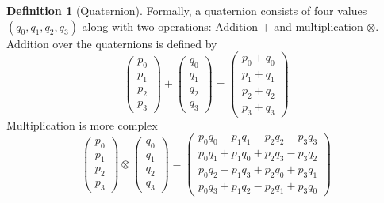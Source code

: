 \documentclass{amsart}
\theoremstyle{definition}
\newtheorem{definition}[theorem]{Definition}
\theoremstyle{remark}
\numberwithin{equation}{section}
\begin{document}
\begin{definition}[Quaternion]
  Formally, a quaternion consists of four values $(q_0, q_1, q_2, q_3)$ along with two operations: Addition $+$ and multiplication $\otimes$.
  Addition over the quaternions is defined by
  \begin{equation}
    \begin{pmatrix}
      p_0 \\
      p_1 \\
      p_2 \\
      p_3
    \end{pmatrix} +
    \begin{pmatrix}
      q_0 \\
      q_1 \\
      q_2 \\
      q_3
    \end{pmatrix} =
    \begin{pmatrix}
      p_0 + q_0 \\
      p_1 + q_1 \\
      p_2 + q_2 \\
      p_3 + q_3
    \end{pmatrix}
  \end{equation}
  Multiplication is more complex
  \begin{equation}
    \begin{pmatrix}
      p_0 \\
      p_1 \\
      p_2 \\
      p_3
    \end{pmatrix} \otimes 
    \begin{pmatrix}
      q_0 \\
      q_1 \\
      q_2 \\
      q_3
    \end{pmatrix} =
    \begin{pmatrix}
      p_0q_0 - p_1q_1 - p_2q_2 - p_3q_3 \\
      p_0q_1 + p_1q_0 + p_2q_3 - p_3q_2 \\
      p_0q_2 - p_1q_3 + p_2q_0 + p_3q_1 \\
      p_0q_3 + p_1q_2 - p_2q_1 + p_3q_0
    \end{pmatrix}
  \end{equation}
\end{definition}
\end{document}
